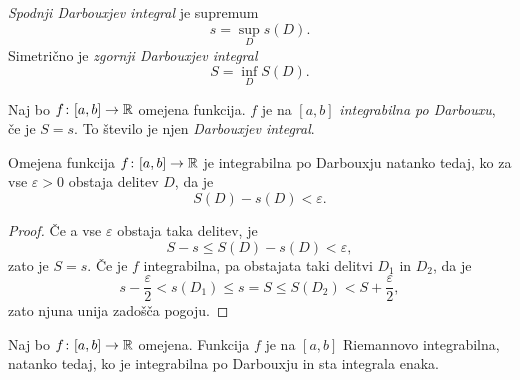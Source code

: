 \documentclass[12pt, a4paper]{article}
\begin{document}
\begin{definicija}
\emph{Spodnji Darbouxjev integral} je supremum
\[
s=\sup_D s(D).
\]
Simetrično je \emph{zgornji Darbouxjev integral}
\[
S=\inf_D S(D).
\]
\end{definicija}

\begin{okvir}
\begin{definicija}
Naj bo $f\colon[a,b]\to\mathbb{R}$ omejena funkcija. $f$ je na $[a,b]$ \emph{integrabilna po Darbouxu}, če je $S=s$. To število je njen \emph{Darbouxjev integral}.
\end{definicija}
\end{okvir}

\begin{trditev}
Omejena funkcija $f\colon[a,b]\to\mathbb{R}$ je integrabilna po Darbouxju natanko tedaj, ko za vse $\varepsilon>0$ obstaja delitev $D$, da je
\[
S(D)-s(D)<\varepsilon.
\]
\end{trditev}

\begin{proof}
Če a vse $\varepsilon$ obstaja taka delitev, je
\[
S-s\leq S(D)-s(D)<\varepsilon,
\]
zato je $S=s$. Če je $f$ integrabilna, pa obstajata taki delitvi $D_1$ in $D_2$, da je
\[
s-\frac{\varepsilon}{2}<s(D_1)\leq s=S\leq S(D_2)<S+\frac{\varepsilon}{2},
\]
zato njuna unija zadošča pogoju.
\end{proof}

\begin{izrek}
Naj bo $f\colon[a,b]\to\mathbb{R}$ omejena. Funkcija $f$ je na $[a,b]$ Riemannovo integrabilna, natanko tedaj, ko je integrabilna po Darbouxju in sta integrala enaka.
\end{izrek}
\end{document}
